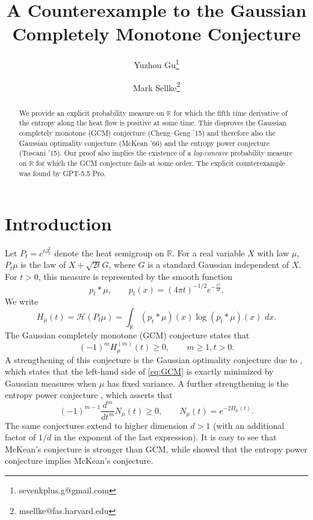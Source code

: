 \documentclass[11pt]{article}
\newcommand{\R}{\mathbb R}
\newcommand{\dd}{\,d}
\newcommand{\calH}{\mathcal H}
\def\isarxiv{1}
\begin{document}
\title{A Counterexample to the Gaussian Completely Monotone Conjecture}
\ifdefined\isarxiv
\author{Yuzhou Gu\thanks{sevenkplus.g@gmail.com} \and Mark Sellke\thanks{msellke@fas.harvard.edu}}
\else
\author{}
\fi
\date{}
\maketitle

\begin{abstract}
We provide an explicit probability measure on \(\R\) for which the fifth time derivative of the entropy along the heat flow is positive at some time. This disproves the Gaussian completely monotone (GCM) conjecture (Cheng--Geng '15) and therefore also the Gaussian optimality conjecture (McKean '66) and the entropy power conjecture (Toscani '15).
Our proof also implies the existence of a \emph{log-concave} probability measure on \(\R\) for which the GCM conjecture fails at some order. The explicit counterexample was found by GPT-5.5 Pro.
\end{abstract}

\section{Introduction} \label{sec:intro}
Let \(P_t=e^{t\partial_x^2}\) denote the heat semigroup on \(\R\). For a real variable \(X\) with law \(\mu\), \(P_t \mu\) is the law of \(X+\sqrt{2t} G\), where \(G\) is a standard Gaussian independent of \(X\). For \(t>0\), this measure is represented by the smooth function
\[
   p_t*\mu,
   \qquad
   p_t(x)=(4\pi t)^{-1/2}e^{-\frac{x^2}{4t}}.
\]
We write
\[
   H_\mu(t)=\calH(P_t\mu)
   =\int_\R (p_t*\mu)(x)\log (p_t*\mu)(x)\,\dd x.
\]
The Gaussian completely monotone (GCM) conjecture \cite{cheng2015higher} states that
\begin{equation}
\label{eq:GCM}
   (-1)^m H_\mu^{(m)}(t)\ge0,
   \qquad m\ge1,t>0.
\end{equation}
A strengthening of this conjecture is the Gaussian optimality conjecture due to \cite[Section 12]{mckean1966speed}, which states that the left-hand side of \eqref{eq:GCM} is exactly minimized by Gaussian measures when \(\mu\) has fixed variance.
A further strengthening is the entropy power conjecture \cite{toscani2015concavity}, which asserts that
\[
(-1)^{m-1}\frac{d^m}{dt^m} N_\mu(t)\geq 0,
\qquad
N_\mu(t)=e^{-2H_\mu(t)}.
\]
The same conjectures extend to higher dimension \(d>1\) (with an additional factor of \(1/d\) in the exponent of the last expression). It is easy to see that McKean's conjecture is stronger than GCM, while \cite{wang2024entropy} showed that the entropy power conjecture implies McKean's conjecture.
\end{document}
